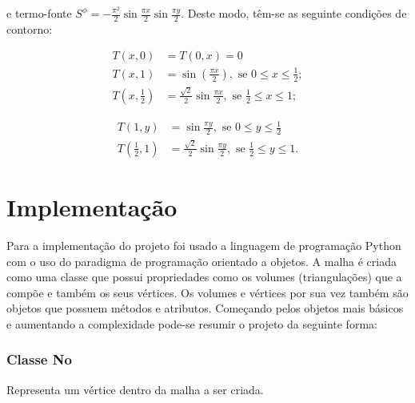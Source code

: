 e termo-fonte $S^\phi = -\frac{\pi^2}{2}\sin{\frac{\pi x}{2}}\sin{\frac{\pi y}{2}}$. Deste modo, têm-se as seguinte condições de contorno:

\begin{equation*}
\begin{split}
    T(x,0)&=T(0,x)=0\\
    T(x,1)&=\sin(\frac{\pi x}{2}), \text{ se } 0 \leq x \leq \frac{1}{2};\\
    T(x,\frac{1}{2})&=\frac{\sqrt{2}}{2} \sin{\frac{\pi x}{2}}, \text{ se } \frac{1}{2} \leq x \leq 1;
\end{split}
\end{equation*}

\begin{equation*}
\begin{split}
    T(1,y)&=\sin{\frac{\pi y}{2}}, \text{ se } 0 \leq y \leq \frac{1}{2}\\
    T(\frac{1}{2},1)&=\frac{\sqrt{2}}{2}\sin{\frac{\pi y}{2}}, \text{ se } \frac{1}{2} \leq y \leq 1.
\end{split}
\end{equation*}
    
\section{Implementação}
Para a implementação do projeto foi usado a linguagem de programação Python com o uso do paradigma de programação orientado a objetos. A malha é criada como uma classe que possui propriedades como os volumes (triangulações) que a compõe e também os seus vértices. Os volumes e vértices por sua vez também são objetos que possuem métodos e atributos. Começando pelos objetos mais básicos e aumentando a complexidade pode-se resumir o projeto da seguinte forma:


\subsubsection{Classe No}
Representa um vértice dentro da malha a ser criada.

